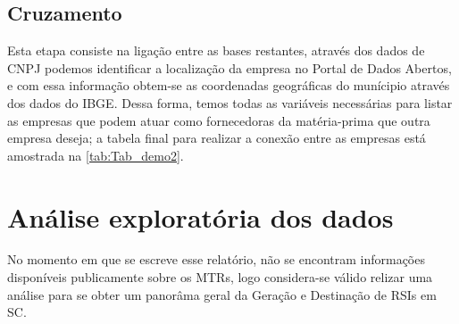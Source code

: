 \subsection{Cruzamento}

Esta etapa consiste na ligação entre as bases restantes, através dos dados de \gls{CNPJ} podemos identificar a localização da empresa no Portal de Dados Abertos, e com essa informação obtem-se as coordenadas geográficas do munícipio através dos dados do \gls{IBGE}. Dessa forma, temos todas as variáveis necessárias para listar as empresas que podem atuar como fornecedoras da matéria-prima que outra empresa deseja; a tabela final para realizar a conexão entre as empresas está amostrada na \autoref{tab:Tab_demo2}.

\begin{table}[htb]
    \ABNTEXfontereduzida
    \centering
    \caption{Amostra da estrutura de dados pós cruzamento. \label{tab:Tab_demo2} }
\end{table}


\section{Análise exploratória dos dados}

No momento em que se escreve esse relatório, não se encontram informações disponíveis publicamente sobre os \gls{MTR}s, logo considera-se válido relizar uma análise para se obter um panorâma geral da Geração e Destinação de \gls{RSI}s em \gls{SC}. 

